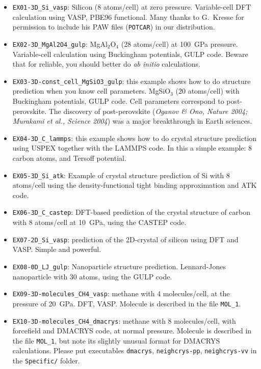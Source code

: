 \documentclass[12pt]{article}
\newcommand{\file}[1]{\texttt{#1}}
\begin{document}
\begin{itemize}
\item  \texttt{EX01-3D\_Si\_vasp}: Silicon (8 atoms/cell) at zero pressure.
Variable-cell DFT calculation using VASP, PBE96 functional. Many thanks to
G.~Kresse for permission to include his PAW files (\file{POTCAR}) in our
distribution.

\item \texttt{EX02-3D\_MgAl2O4\_gulp}: MgAl$_2$O$_4$ (28 atoms/cell) at
100~GPa pressure. Variable-cell calculation using Buckingham potentials, GULP
code. Beware that for reliable, you should better do \emph{ab initio}
calculations.

\item \texttt{EX03-3D-const\_cell\_MgSiO3\_gulp}: this example shows how to do
structure prediction when you know cell parameters. MgSiO$_3$ (20 atoms/cell)
with Buckingham potentials, GULP code. Cell parameters correspond to
post-perovskite. The discovery of post-perovskite (\textit{Oganov \& Ono, Nature
2004; Murakami et al., Science 2004}) was a major breakthrough in Earth
sciences.

\item \texttt{EX04-3D\_C\_lammps}: this example shows how to do crystal
structure prediction using USPEX together with the LAMMPS code. In this a simple
example: 8 carbon atoms, and Tersoff potential.

\item \texttt{EX05-3D\_Si\_atk}: Example of crystal structure prediction of Si
with 8 atoms/cell using the density-functional tight binding approximation and
ATK code.

\item \texttt{EX06-3D\_C\_castep}: DFT-based prediction of the crystal structure
of carbon with 8 atoms/cell at 10~GPa, using the CASTEP code.

\item \texttt{EX07-2D\_Si\_vasp}: prediction of the 2D-crystal of silicon using
DFT and VASP. Simple and powerful.

\item \texttt{EX08-0D\_LJ\_gulp}: Nanoparticle structure prediction.
Lennard-Jones nanoparticle with 30 atoms, using the GULP code.

\item \texttt{EX09-3D-molecules\_CH4\_vasp}: methane with 4 molecules/cell,
at the pressure of 20~GPa. DFT, VASP. Molecule is described in the file
\file{MOL\_1}.

\item \texttt{EX10-3D-molecules\_CH4\_dmacrys}: methane with 8
molecules/cell, with forcefield and DMACRYS code, at normal pressure. Molecule
is described in the file \file{MOL\_1}, but note its slightly unusual format for
DMACRYS calculations. Please put executables \file{dmacrys},
\file{neighcrys-pp}, \file{neighcrys-vv} in the \file{Specific/} folder.


\end{itemize}
\end{document}
